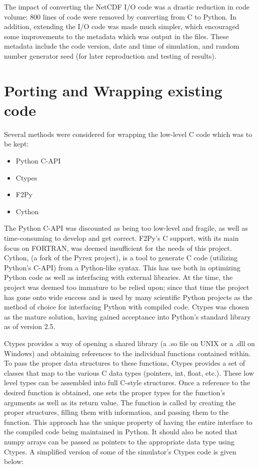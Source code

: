 \documentclass[twocolumn]{article}
\begin{document}
The impact of converting the NetCDF I/O code was a drastic reduction in code
volume: 800 lines of code were removed by converting from C to Python. In
addition, extending the I/O code was made much simpler, which encouraged
some improvements to the metadata which was output in the files. These metadata
include the code version, date and time of simulation, and random number generator
seed (for later reproduction and testing of results).

\section{Porting and Wrapping existing code}
Several methods were considered for wrapping the low-level C code which was to
be kept:
\begin{itemize}
    \item Python C-API
    \item Ctypes
    \item F2Py
    \item Cython
\end{itemize}
The Python C-API was discounted as being too low-level and fragile, as well
as time-consuming to develop and get correct.  F2Py's C support, with its
main focus on FORTRAN, was deemed insufficient for the needs of this project.
Cython, (a fork of the Pyrex project), is a tool to generate C code (utilizing
Python's C-API) from a Python-like syntax. This has use both in optimizing
Python code as well as interfacing with external libraries. At the time, the
project was deemed too immature to be relied upon; since that time the project
has gone onto wide success and is used by many scientific Python projects
as the method of choice for interfacing Python with compiled code. Ctypes was
chosen as the mature solution, having gained acceptance into Python's standard
library as of version 2.5. \cite{CTYPES REFERENCE}

Ctypes provides a way of opening a shared library (a .so file on UNIX or a .dll
on Windows) and obtaining references to the individual functions contained
within. To pass the proper data structures to these functions, Ctypes provides
a set of classes that map to the various C data types (pointers, int, float, etc.).
These low level types can be assembled into full C-style structures. Once a reference
to the desired function is obtained, one sets the proper types for the function's
arguments as well as its return value. The function is called by creating the
proper structures, filling them with information, and passing them to the function.
This approach has the unique property of having the entire interface to the compiled
code being maintained in Python. It should also be noted that numpy arrays
can be passed as pointers to the appropriate data type using Ctypes.
A simplified version of some of the simulator's Ctypes code is given below:

\end{document}
